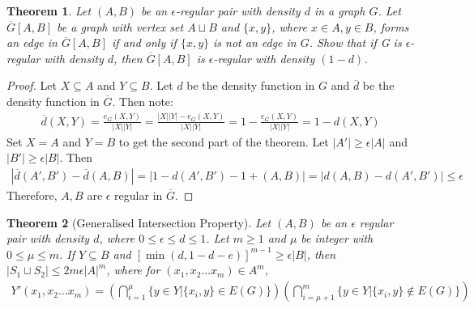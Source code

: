 \documentclass{article}
\newtheorem{theorem}{Theorem}[]
\begin{document}
\begin{theorem}
	Let $(A, B)$ be an $\epsilon$-regular pair with density $d$ in a graph $G$. Let $\overline G[A, B]$ be a graph with vertex set $A \sqcup B$ and $\{x, y\}$, where $x \in A, y \in B$, forms an edge in $\overline G[A, B]$ if and only if $\{x, y\}$ is not an edge
in $G$. Show that if G is $\epsilon$-regular with density $d$, then $\overline G[A, B]$ is $\epsilon$-regular with density $(1 - d)$.
\end{theorem}
\begin{proof}
	Let $X\subseteq A$ and $Y\subseteq B$. Let $d$ be the density function in $G$ and $\overline d$ be the density function in $\overline G$. Then note:
	\begin{align}
		\overline d(X,Y)=\frac{e_{\overline G}(X,Y)}{|X||Y|}=\frac{|X||Y|-e_{G}(X,Y)}{|X||Y|}=1-\frac{e_{G}(X,Y)}{|X||Y|}=1-d(X,Y)
	\end{align}
	Set $X=A$ and $Y=B$ to get the second part of the theorem. Let $|A'|\geq \epsilon|A|$ and $|B'|\geq  \epsilon|B|$. Then
	\begin{align}
		|\overline d(A',B')-\overline d(A,B)|=|1- d(A',B')-1+(A,B)|=|d(A,B)-d(A',B')|\leq  \epsilon
	\end{align} 
	Therefore, $A,B$ are $\epsilon$ regular in $\overline G$.
\end{proof}















\begin{theorem}[Generalised Intersection Property]
	Let $(A,B)$ be an $\epsilon$ regular pair with density $d$,  where $0\leq \epsilon\leq d\leq 1$. Let $m\geq  1$ and $\mu$ be integer with $0\leq  \mu\leq  m$. If $Y\subseteq B$ and $[\min(d,1-d-e)]^{m-1}\geq \epsilon |B|$, then $|S_1\sqcup S_2|\leq 2m\epsilon|A|^m$, where for $(x_1,x_2\hdots x_m)\in A^m$,
	\begin{align}Y'(x_1,x_2\hdots x_m)=\left(\bigcap_{i=1}^\mu \{y\in Y|\{x_i,y\}\in E(G) \}\right)\left(\bigcap_{i=\mu+1}^m \{y\in Y|\{x_i,y\}\notin E(G) \}\right)\end{align} 
\end{theorem}
\end{document}
